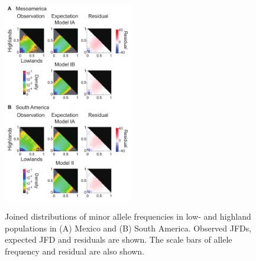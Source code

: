 \begin{figure}[tb]   
  \begin{center}
   \vspace{-0mm}
   \includegraphics[width=0.5\textwidth]{fig/Fig4}
   \renewcommand{\baselinestretch}{0.9}
   \vspace{-3mm}
   \caption{Joined distributions of minor allele frequencies in low- and highland populations in (A) Mexico and (B) South America.  Observed JFDs, expected JFD and residuals are shown.  The scale bars of allele frequency and residual are also shown.     }
\vspace{-6mm}
    \label{JFD}
  \end{center}
\end{figure}

